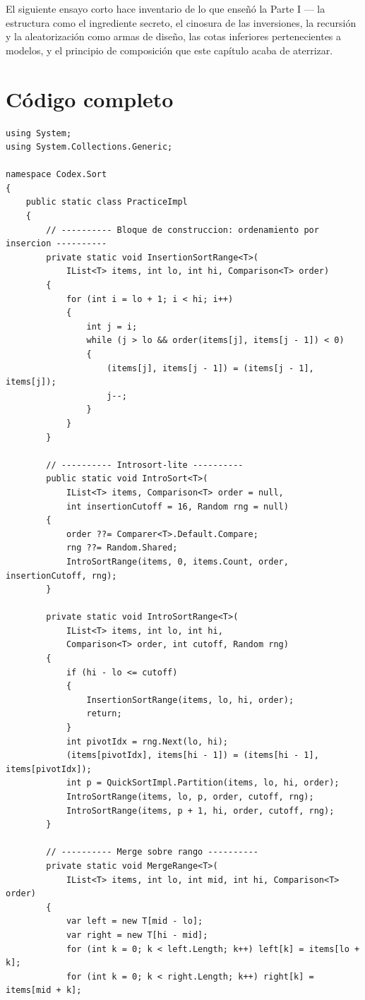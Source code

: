 \documentclass[11pt,a4paper]{article}
\begin{document}
El siguiente ensayo corto hace inventario de lo que enseñó la Parte I --- la estructura como el ingrediente secreto, el cinosura de las inversiones, la recursión y la aleatorización como armas de diseño, las cotas inferiores pertenecientes a modelos, y el principio de composición que este capítulo acaba de aterrizar.

\section{Código completo}

\begin{lstlisting}[caption={\texttt{Practice.cs} --- introsort-lite y Timsort-lite}]
using System;
using System.Collections.Generic;

namespace Codex.Sort
{
    public static class PracticeImpl
    {
        // ---------- Bloque de construccion: ordenamiento por insercion ----------
        private static void InsertionSortRange<T>(
            IList<T> items, int lo, int hi, Comparison<T> order)
        {
            for (int i = lo + 1; i < hi; i++)
            {
                int j = i;
                while (j > lo && order(items[j], items[j - 1]) < 0)
                {
                    (items[j], items[j - 1]) = (items[j - 1], items[j]);
                    j--;
                }
            }
        }

        // ---------- Introsort-lite ----------
        public static void IntroSort<T>(
            IList<T> items, Comparison<T> order = null,
            int insertionCutoff = 16, Random rng = null)
        {
            order ??= Comparer<T>.Default.Compare;
            rng ??= Random.Shared;
            IntroSortRange(items, 0, items.Count, order, insertionCutoff, rng);
        }

        private static void IntroSortRange<T>(
            IList<T> items, int lo, int hi,
            Comparison<T> order, int cutoff, Random rng)
        {
            if (hi - lo <= cutoff)
            {
                InsertionSortRange(items, lo, hi, order);
                return;
            }
            int pivotIdx = rng.Next(lo, hi);
            (items[pivotIdx], items[hi - 1]) = (items[hi - 1], items[pivotIdx]);
            int p = QuickSortImpl.Partition(items, lo, hi, order);
            IntroSortRange(items, lo, p, order, cutoff, rng);
            IntroSortRange(items, p + 1, hi, order, cutoff, rng);
        }

        // ---------- Merge sobre rango ----------
        private static void MergeRange<T>(
            IList<T> items, int lo, int mid, int hi, Comparison<T> order)
        {
            var left = new T[mid - lo];
            var right = new T[hi - mid];
            for (int k = 0; k < left.Length; k++) left[k] = items[lo + k];
            for (int k = 0; k < right.Length; k++) right[k] = items[mid + k];


\end{lstlisting}
\end{document}
